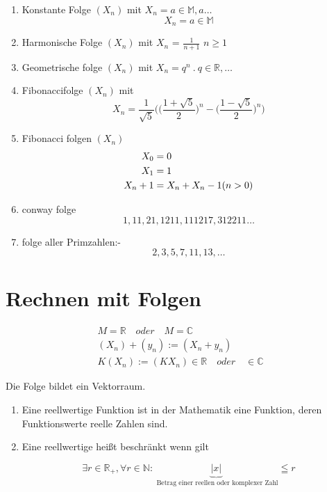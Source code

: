 \begin{example}
    \[\]
    \begin{enumerate}

        \item Konstante Folge $(X_n)$ mit \quad $X_n = a \in \mathbb{M },a \dots$ \\
        \[ X_n = a \in \mathbb{M} \]
        \item Harmonische Folge $(X_n)$  mit $X_n$ =  $\frac{1}{n+1}$ \quad$ n \geq 1$
        \item Geometrische folge $(X_n)$ mit $X_n = q^n \:. \: q \in \mathbb{R}, \dots $
        \item Fibonaccifolge $(X_n)$ mit
        \[ X_n =\frac{1}{\sqrt{5}} \Big(  \big( \frac{1+ \sqrt{5}}{2} \big)^n - \big( \frac{1- \sqrt{5}}{2}\big)^n   \Big)    \]

        \item Fibonacci folgen $(X_n)$
        \begin{align}
            X_0 &=0 \notag \\X_1 &= 1 \notag \\
            X_n+1 &= X_n+X_n-1 (n>0)  \notag
        \end{align}

        \item conway  folge
        \[ 1, 11 ,21 , 1211, 111217, 312211 \dots \]

        \item folge aller Primzahlen:- \[ 2, 3 ,5 ,7 ,11, 13 , \dots \]

    \end{enumerate}
\end{example}

\section{Rechnen mit Folgen }
\begin{align*}
    M  = \mathbb{R} \quad oder \quad M = \mathbb{C} \\
    (X_n)+(y_n) := (X_n+y_n)\\
    K(X_n):=(KX_n)\in \mathbb{R} \quad  oder \quad \in  \mathbb{C}
\end{align*}
\begin{remark}
    \[\]
    Die Folge bildet ein Vektorraum.
\end{remark}


\begin{definition}


    \begin{enumerate}

        \mbox{}\item Eine reellwertige Funktion ist in der Mathematik eine Funktion, deren Funktionswerte reelle Zahlen sind.

        \item Eine reellwertige heißt beschränkt wenn gilt

        \[	\exists r \in \mathbb{R}_+ , \forall r \in \mathbb{N}: \underbrace{|x|}_{\text{ Betrag einer reellen oder komplexer Zahl}} \leqq r   \]

    \end{enumerate}
\end{definition}

